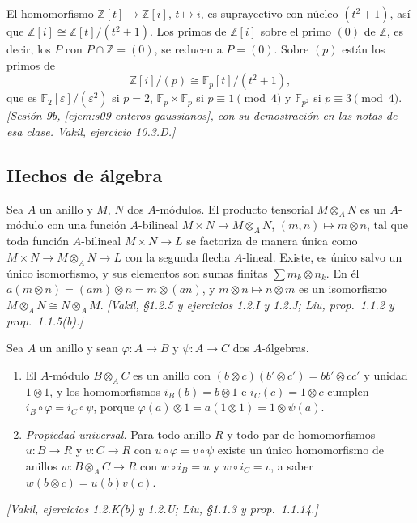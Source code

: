 \begin{ejem}
\label{ejem:s11-enteros-gaussianos}
El homomorfismo \(\mathbb Z[t]\to\mathbb Z[i]\), \(t\mapsto i\), es suprayectivo con núcleo \((t^2+1)\), así que \(\mathbb Z[i]\cong\mathbb Z[t]/(t^2+1)\). Los primos de \(\mathbb Z[i]\) sobre el primo \((0)\) de \(\mathbb Z\), es decir, los \(P\) con \(P\cap\mathbb Z=(0)\), se reducen a \(P=(0)\). Sobre \((p)\) están los primos de
\[
 \mathbb Z[i]/(p)\cong\mathbb F_p[t]/(t^2+1),
\]
que es \(\mathbb F_2[\varepsilon]/(\varepsilon^2)\) si \(p=2\), \(\mathbb F_p\times\mathbb F_p\) si \(p\equiv1\pmod4\) y \(\mathbb F_{p^2}\) si \(p\equiv3\pmod4\). \emph{[Sesión 9b, \cref{ejem:s09-enteros-gaussianos}, con su demostración en las notas de esa clase. Vakil, ejercicio 10.3.D.]}
\end{ejem}

\subsection{Hechos de álgebra}

\begin{defi}
\label{defi:s11-tensor-modulos}
Sea \(A\) un anillo y \(M\), \(N\) dos \(A\)-módulos. El producto tensorial \(M\otimes_A N\) es un \(A\)-módulo con una función \(A\)-bilineal \(M\times N\to M\otimes_A N\), \((m,n)\mapsto m\otimes n\), tal que toda función \(A\)-bilineal \(M\times N\to L\) se factoriza de manera única como \(M\times N\to M\otimes_A N\to L\) con la segunda flecha \(A\)-lineal. Existe, es único salvo un único isomorfismo, y sus elementos son sumas finitas \(\sum m_k\otimes n_k\). En él \(a(m\otimes n)=(am)\otimes n=m\otimes(an)\), y \(m\otimes n\mapsto n\otimes m\) es un isomorfismo \(M\otimes_A N\cong N\otimes_A M\). \emph{[Vakil, \S1.2.5 y ejercicios 1.2.I y 1.2.J; Liu, prop.~1.1.2 y prop.~1.1.5(b).]}
\end{defi}

\begin{prop}
\label{prop:s11-tensor-algebras}
Sea \(A\) un anillo y sean \(\varphi\colon A\to B\) y \(\psi\colon A\to C\) dos \(A\)-álgebras.
\begin{enumerate}[label=(\alph*)]
\item El \(A\)-módulo \(B\otimes_A C\) es un anillo con \((b\otimes c)(b'\otimes c')=bb'\otimes cc'\) y unidad \(1\otimes1\), y los homomorfismos \(i_B(b)=b\otimes1\) e \(i_C(c)=1\otimes c\) cumplen \(i_B\circ\varphi=i_C\circ\psi\), porque \(\varphi(a)\otimes1=a(1\otimes1)=1\otimes\psi(a)\).
\item \emph{Propiedad universal.} Para todo anillo \(R\) y todo par de homomorfismos \(u\colon B\to R\) y \(v\colon C\to R\) con \(u\circ\varphi=v\circ\psi\) existe un único homomorfismo de anillos \(w\colon B\otimes_A C\to R\) con \(w\circ i_B=u\) y \(w\circ i_C=v\), a saber \(w(b\otimes c)=u(b)v(c)\).
\end{enumerate}
\emph{[Vakil, ejercicios 1.2.K(b) y 1.2.U; Liu, \S1.1.3 y prop.~1.1.14.]}
\end{prop}

